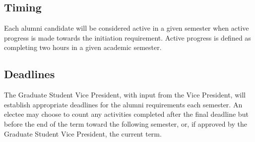 \subsection{Timing} \label{C.7}

Each alumni candidate will be considered active in a given semester
when active progress is made towards the initiation requirement. Active progress is defined
as completing two hours in a given academic semester.


\subsection{Deadlines} \label{C.8}

The Graduate Student Vice President, with input from the
Vice President, will establish appropriate deadlines for the alumni requirements each semester.
An electee may choose to count any activities completed after the final deadline but before
the end of the term toward the following semester, or, if approved by the Graduate Student
Vice President, the current term.